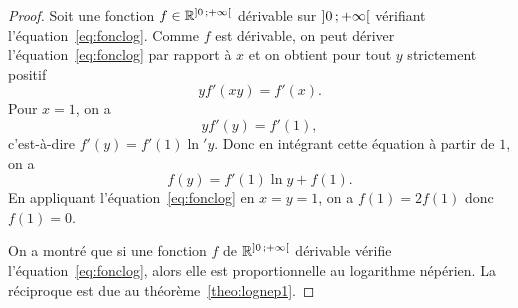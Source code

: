 \begin{proof}
  Soit une fonction \(f \in \mathbb{R}^{\left] 0 \, ;  +\infty \right[}\) dérivable sur \(\left] 0 \, ;  +\infty \right[\) vérifiant l'équation~\eqref{eq:fonclog}. Comme \(f\) est dérivable, on peut dériver l'équation~\eqref{eq:fonclog} par rapport à \(x\) et on obtient pour tout \(y\) strictement positif
  \begin{equation}
    y f'(xy)=f'(x).
  \end{equation}
  Pour \(x=1\), on a
  \begin{equation}
    y f'(y)=f'(1),
  \end{equation}
  c'est-à-dire \(f'(y)=f'(1) \ln' y\). Donc en intégrant cette équation à partir de \(1\), on a
  \begin{equation}
    f(y)=f'(1)\ln y + f(1).
  \end{equation}
  En appliquant l'équation~\eqref{eq:fonclog} en \(x=y=1\), on a \(f(1)=2f(1)\) donc \(f(1)=0\).

  On a montré que si une fonction \(f\) de \(\mathbb{R}^{\left] 0 \, ;  +\infty \right[}\) dérivable vérifie l'équation~\eqref{eq:fonclog}, alors elle est proportionnelle au logarithme népérien. La réciproque est due au théorème~\ref{theo:lognep1}.
\end{proof}
%
